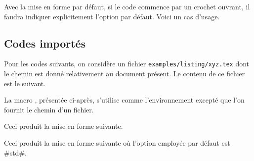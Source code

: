 

\begin{bdocwarn}
    Avec la mise en forme par défaut, si le code commence par un crochet ouvrant, il faudra indiquer explicitement l'option par défaut. Voici un cas d'usage.

\end{bdocwarn}



\subsection{Codes importés}

Pour les codes suivants, on considère un fichier \verb+examples/listing/xyz.tex+ dont le chemin est donné relativement au document présent.
Le contenu de ce fichier est le suivant.


\medskip

La macro  , présentée ci-après, s'utilise comme l'environnement  excepté que l'on fournit le chemin d'un fichier.




\begin{bdocexa}
    \leavevmode

    \begin{bdoclatex}[code]
    \end{bdoclatex}

    Ceci produit la mise en forme suivante.

\end{bdocexa}




\begin{bdocexa}[À la suite]
    \leavevmode

    \begin{bdoclatex}[code]
    \end{bdoclatex}

    Ceci produit la mise en forme suivante où l'option employée par défaut est \bdocinlatex#std#.

\end{bdocexa}


